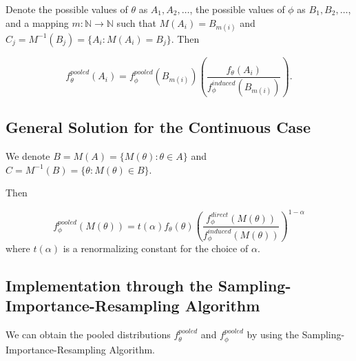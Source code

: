 \documentclass[12pt,twoside]{smiththesis}
\begin{document}
Denote the possible values of \(\theta\) as \(A_1, A_2, \dots\), the possible values of \(\phi\) as \(B_1, B_2, \dots\), and a mapping \(m: \mathbb{N} \to \mathbb{N}\) such that \(M(A_i) = B_{m(i)}\) and \(C_j = M^{-1}(B_j) = \{A_i : M(A_i) = B_j\}\). Then

\[f_\theta^{pooled}(A_i) = f_\phi^{pooled}(B_{m(i)}) \left( \frac{f_\theta(A_i)}{f_\phi^{induced}(B_{m(i)})} \right).\]

\hypertarget{general-solution-for-the-continuous-case}{%
\subsection{General Solution for the Continuous Case}\label{general-solution-for-the-continuous-case}}

We denote \(B = M(A) = \{M(\theta) : \theta \in A \}\) and \(C = M^{-1}(B) = \{\theta: M(\theta) \in B \}\).

Then

\[
f_\phi^{pooled} (M(\theta)) =t({\alpha}) f_\theta(\theta) \left( \frac{f_\phi^{direct}(M(\theta))}{f_\phi^{induced}(M(\theta))} \right)^{1-\alpha} \tag{2}
\]
where \(t({\alpha})\) is a renormalizing constant for the choice of \(\alpha\).

\hypertarget{implementation-through-the-sampling-importance-resampling-algorithm}{%
\subsection{Implementation through the Sampling-Importance-Resampling Algorithm}\label{implementation-through-the-sampling-importance-resampling-algorithm}}

We can obtain the pooled distributions \(f^{pooled}_\theta\) and \(f^{pooled}_\phi\) by using the Sampling-Importance-Resampling Algorithm.
\end{document}
